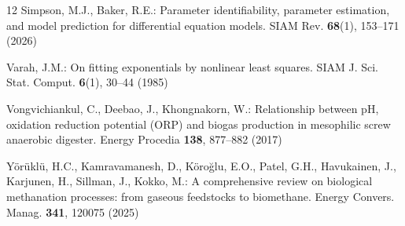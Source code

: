 \documentclass[runningheads]{llncs}
\begin{document}
\begin{thebibliography}{12}
Simpson, M.J., Baker, R.E.: Parameter identifiability, parameter
estimation, and model prediction for differential equation models.
SIAM Rev. \textbf{68}(1), 153--171 (2026)

Varah, J.M.: On fitting exponentials by nonlinear least squares. SIAM
J. Sci. Stat. Comput. \textbf{6}(1), 30--44 (1985)

Vongvichiankul, C., Deebao, J., Khongnakorn, W.: Relationship between
pH, oxidation reduction potential (ORP) and biogas production in
mesophilic screw anaerobic digester. Energy Procedia \textbf{138},
877--882 (2017)

Y\"{o}r\"{u}kl\"{u}, H.C., Kamravamanesh, D., K\"{o}ro\u{g}lu, E.O.,
Patel, G.H., Havukainen, J., Karjunen, H., Sillman, J., Kokko, M.:
A comprehensive review on biological methanation processes: from gaseous
feedstocks to biomethane. Energy Convers. Manag. \textbf{341}, 120075
(2025)

\end{thebibliography}
\end{document}

